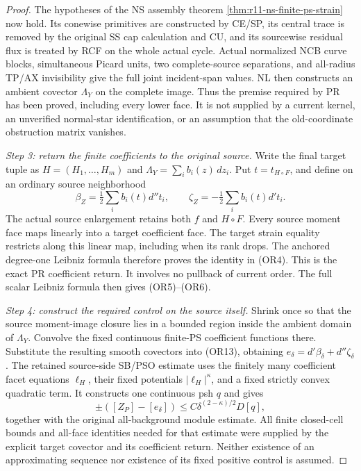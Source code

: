 \begin{proof}
The hypotheses of the NS assembly theorem
\ref{thm:r11-ns-finite-ps-strain} now hold. Its conewise primitives
are constructed by CE/SP, its central trace is removed by the
original SS cap calculation and CU, and its sourcewise residual
flux is treated by RCF on the whole actual cycle. Actual normalized
NCB curve blocks, simultaneous Picard units, two complete-source
separations, and all-radius TP/AX invisibility give the full joint
incident-span values. NL then constructs an ambient covector
\(\Lambda_Y\) on the complete image. Thus the premise required by
PR has been proved, including every lower face. It is not supplied
by a current kernel, an unverified normal-star identification, or
an assumption that the old-coordinate obstruction matrix vanishes.

\emph{Step 3: return the finite coefficients to the original source.}
Write the final target tuple as \(H=(H_1,\ldots,H_m)\) and
\(\Lambda_Y=\sum_i b_i(z)\,dz_i\). Put \(t=t_{H\circ F}\),
and define on an ordinary source neighborhood
\[
 \beta_Z=\tfrac12\sum_i b_i(t)d''t_i,
                 \qquad \zeta_Z=-\tfrac12\sum_i b_i(t)d't_i.
\tag{OR13}
\]
The actual source enlargement retains both \(f\) and \(H\circ F\).
Every source moment face maps linearly into a target coefficient
face. The target strain equality restricts along this linear map,
including when its rank drops. The anchored degree-one Leibniz
formula therefore proves the identity in (OR4). This is the exact
PR coefficient return. It involves no pullback of current order.
The full scalar Leibniz formula then gives (OR5)--(OR6).

\emph{Step 4: construct the required control on the source itself.}
Shrink once so that the source moment-image closure lies in a
bounded region inside the ambient domain of \(\Lambda_Y\).
Convolve the fixed continuous finite-PS coefficient functions there.
Substitute the resulting smooth covectors into (OR13), obtaining
\(e_\delta=d'\beta_\delta+d''\zeta_\delta\).
The retained source-side SB/PSO estimate uses the finitely many
coefficient facet equations \(\ell_H\), their fixed potentials
\(|\ell_H|^\kappa\), and a fixed strictly convex quadratic term.
It constructs one continuous psh \(q\) and gives
\[
        \pm([Z_P]-[e_\delta])
                  \le C\delta^{(2-\kappa)/2}D[q],
\tag{OR14}
\]
together with the original all-background module estimate.
All finite closed-cell bounds and all-face identities needed for
that estimate were supplied by the explicit target covector and
its coefficient return. Neither existence of an approximating
sequence nor existence of its fixed positive control is assumed.


\end{proof}
